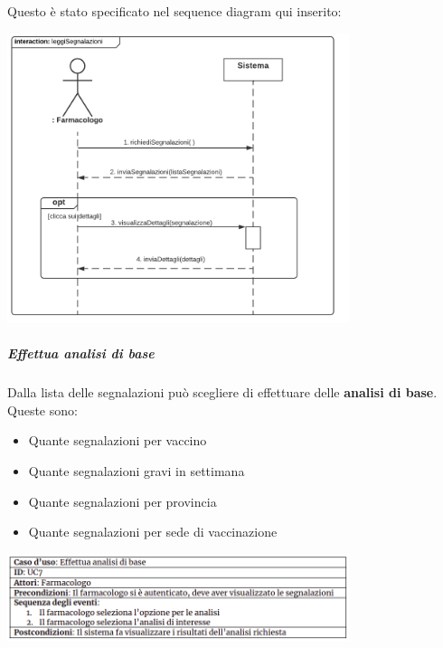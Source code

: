 \documentclass{article}
\begin{document}
\newpage
    Questo è stato specificato nel sequence diagram qui inserito:
        \begin{center}
            \includegraphics[width=0.75\textwidth]{pictures/SDFarmacologo1_Segnalazioni.png}
        \end{center}
    \subparagraph*{Effettua analisi di base}
    Dalla lista delle segnalazioni può scegliere di effettuare delle \textbf{analisi di base}. Queste sono:
        \begin{itemize}
            \item Quante segnalazioni per vaccino
            \item Quante segnalazioni gravi in settimana
            \item Quante segnalazioni per provincia 
            \item Quante segnalazioni per sede di vaccinazione
        \end{itemize}
        \begin{center}
            \includegraphics[width=0.75\textwidth]{pictures/UC7.png}
        \end{center}
\end{document}
